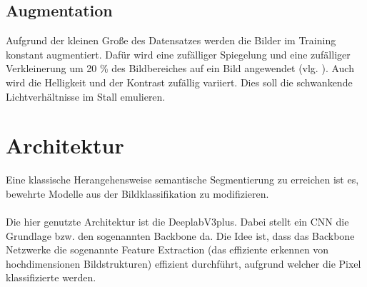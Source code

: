 \documentclass[12pt,DIV=15,BCOR=15mm,twoside,headsepline,abstract=true,listof=totoc,bibliography=totoc]{scrreprt}
\theoremstyle{remark}    %
\begin{document}
    \subsection{Augmentation}
    Aufgrund der kleinen Große des Datensatzes werden die Bilder im Training konstant augmentiert. Dafür wird eine zufälliger Spiegelung und eine zufälliger
    Verkleinerung um 20 \% des Bildbereiches auf ein Bild angewendet (vlg. \cite{chen2017rethinkingatrousconvolutionsemantic,HaitzHuebnerUlrich2022}).  
    Auch wird die Helligkeit und der Kontrast zufällig variiert. Dies soll die schwankende Lichtverhältnisse im Stall emulieren.

    \section{Architektur}
    Eine klassische Herangehensweise semantische Segmentierung zu erreichen ist es, bewehrte Modelle aus der Bildklassifikation zu modifizieren.\\\\
    Die hier genutzte Architektur ist die DeeplabV3plus. Dabei stellt ein \ac{CNN} die Grundlage
    bzw. den sogenannten Backbone da. Die Idee ist, dass das Backbone Netzwerke die sogenannte Feature Extraction (das effiziente erkennen von
    hochdimensionen Bildstrukturen) effizient durchführt, aufgrund welcher die Pixel klassifizierte werden.
    \cite{chen2018encoderdecoderatrousseparableconvolution}
\end{document}
